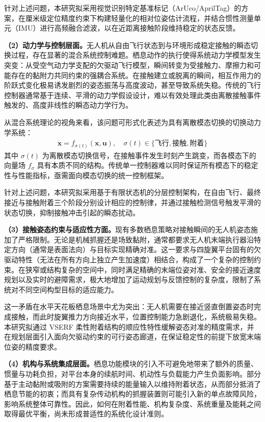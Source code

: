 针对上述问题，本研究拟采用视觉识别特定基准标记（ArUco/AprilTag）的方案，在厘米级定位精度约束下构建轻量化的相对位姿估计流程，并结合惯性测量单元（IMU）进行高频融合滤波，以在近距离接触阶段维持稳定的状态反馈。

\textbf{（2）动力学与控制层面。}无人机从自由飞行状态到与环境形成稳定接触的瞬态切换过程，存在显著的混合系统控制难题。栖息动作的执行使得系统动力学模型发生突变：从受空气动力学支配的欠驱动飞行模型，瞬间转变为受接触力、摩擦力和可能存在的黏附力共同约束的强耦合系统。在接触建立或脱离的瞬间，相互作用力的阶跃式变化极易诱发剧烈的姿态振荡与高度波动，甚至导致系统失稳。传统的飞行控制器通常基于连续、平滑的动力学假设设计，难以有效处理此类由离散接触事件触发的、高度非线性的瞬态动力学行为。

从混合系统理论的视角来看，该问题可形式化表述为具有离散模态切换的切换动力学系统：
\begin{align}
\dot{\mathbf{x}} = f_{\sigma(t)}(\mathbf{x}, \mathbf{u}), \quad \sigma(t) \in \{\text{飞行}, \text{接触}, \text{附着}\}
\end{align}
其中 $\sigma(t)$ 为离散模态切换信号，在接触事件发生时刻产生跳变，而各模态下的向量场 $f_\sigma$ 具有本质不同的结构。传统单一控制器难以同时保证所有模态下的稳定性与性能指标，亟需面向模态切换的统一控制框架。

针对上述问题，本研究拟采用基于有限状态机的分层控制架构，在自由飞行、最终接近与接触附着三个阶段分别设计相应的控制律，并通过接触检测信号触发平滑的状态切换，抑制接触冲击引起的瞬态扰动。

\textbf{（3）接触姿态约束与适应性方面。}现有多数栖息策略对接触瞬间的无人机姿态施加了严格限制。无论是机械抓握还是场致黏附，通常都要求无人机末端执行器沿特定方向（通常是表面法向）与目标实现精确对准。这一要求与四旋翼平台固有的欠驱动特性（无法在所有方向上独立产生加速度）相结合，构成了一个复杂的控制约束。在狭窄或结构复杂的空间中，同时满足精确的末端位姿对准、安全的接近速度规划以及实时的避障需求，极大地增加了运动规划与反馈控制的复杂度，限制了系统对不同空间构型目标的适应能力。

这一矛盾在水平天花板栖息场景中尤为突出：无人机需要在接近竖直倒置姿态时完成接触，而此时旋翼推力方向接近水平，位置控制能力急剧退化，系统极易失稳。本研究拟通过 VSERF 柔性附着结构的顺应性特性缓解姿态对准的精度需求，并在规划层面引入面向欠驱动约束的可行姿态廊道，在保证稳定性的前提下放宽末端位姿的精度要求。

\textbf{（4）机构与系统集成层面。}栖息功能模块的引入不可避免地带来了额外的质量、惯量与功耗负担，对平台本身的续航时间、机动性与负载能力产生负面影响。部分基于主动黏附或吸附的方案需要持续的能量输入以维持附着状态，从而部分抵消了栖息节能的初衷；而具有复杂传动机构的抓握装置则可能引入新的单点故障风险，影响系统整体可靠性。因此，如何在附着性能、机构复杂度、系统重量及能耗之间取得最优平衡，尚未形成普适性的系统化设计准则。


